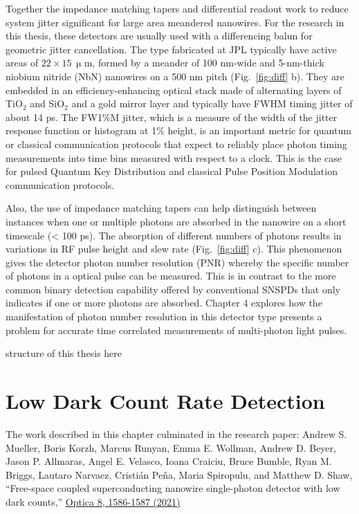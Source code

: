 \documentclass[11pt]{caltech_thesis} %
\begin{document}
Together the impedance matching tapers and differential readout work to reduce system jitter significant for large area meandered nanowires. For the research in this thesis, these detectors are usually used with a differencing balun for geometric jitter cancellation. The type fabricated at JPL typically have active areas of $22 \times 15 \ \mathrm{\upmu m}$, formed by a meander of 100 nm-wide and 5-nm-thick niobium nitride (NbN) nanowires on a 500 nm pitch (Fig.~\ref{fig:diff} b). They are embedded in an efficiency-enhancing optical stack made of alternating layers of TiO$_2$ and SiO$_2$ and a gold mirror layer and typically have FWHM timing jitter of about 14 ps. The FW1\%M jitter, which is a measure of the width of the jitter response function or histogram at 1\% height, is an important metric for quantum or classical communication protocols that expect to reliably place photon timing measurements into time bins measured with respect to a clock. This is the case for pulsed Quantum Key Distribution and classical Pulse Position Modulation communication protocols.

Also, the use of impedance matching tapers can help distinguish between instances when one or multiple photons are absorbed in the nanowire on a short timescale (\textless{} 100 ps). The absorption of different numbers of photons results in variations in RF pulse height and slew rate (Fig.~\ref{fig:diff} c). This phenomenon gives the detector photon number resolution (PNR) whereby the specific number of photons in a optical pulse can be measured. This is in contrast to the more common binary detection capability offered by conventional SNSPDs that only indicates if one or more photons are absorbed. Chapter 4 explores how the manifestation of photon number resolution in this detector type presents a problem for accurate time correlated measurements of multi-photon light pulses.

structure of this thesis here

\hypertarget{low-dark-count-rate-detection}{%
\chapter{Low Dark Count Rate Detection}\label{low-dark-count-rate-detection}}

The work described in this chapter culminated in the research paper: Andrew S. Mueller, Boris Korzh, Marcus Runyan, Emma E. Wollman, Andrew D. Beyer, Jason P. Allmaras, Angel E. Velasco, Ioana Craiciu, Bruce Bumble, Ryan M. Briggs, Lautaro Narvaez, Cristián Peña, Maria Spiropulu, and Matthew D. Shaw, ``Free-space coupled superconducting nanowire single-photon detector with low dark counts,'' \href{https://opg.optica.org/optica/fulltext.cfm?uri=optica-8-12-1586\&id=465726}{Optica 8, 1586-1587 (2021)}
\end{document}
